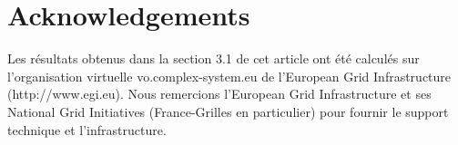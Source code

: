 




\begingroup

\let\clearpage\relax
\let\cleardoublepage\relax
\let\cleardoublepage\relax

\chapter*{Acknowledgements}


\noindent Les résultats obtenus dans la section 3.1 de cet article ont été calculés sur l'organisation virtuelle vo.complex-system.eu de l'European Grid Infrastructure (http://www.egi.eu). Nous remercions l'European Grid Infrastructure et ses National Grid Initiatives (France-Grilles en particulier) pour fournir le support technique et l'infrastructure. \\




\endgroup